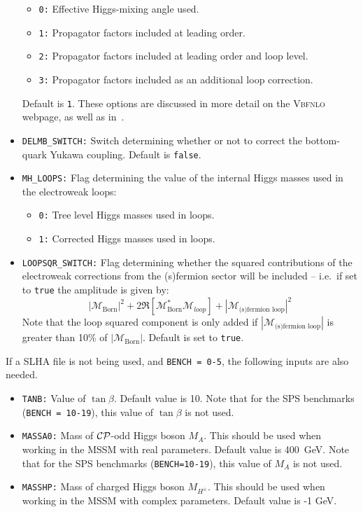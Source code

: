 \documentclass[english,12pt]{article}
\begin{document}
\begin{itemize}
   \begin{itemize}
    \item {\tt 0:} Effective Higgs-mixing angle used.
    \item {\tt 1:} Propagator factors included at leading order.
    \item {\tt 2:} Propagator factors included at leading order and loop level.
    \item {\tt 3:} Propagator factors included as an additional loop correction.
   \end{itemize}
  Default is {\tt 1}.  These options are discussed in more detail on the \textsc{Vbfnlo} webpage, as well as in~\cite{Figy:2010ct}.
  \item {\tt DELMB\_SWITCH:} Switch determining whether or not to correct the bottom-quark
Yukawa coupling.  Default is {\tt false}.
  \item {\tt MH\_LOOPS:} Flag determining the value of the internal Higgs masses used in the electroweak loops:
   \begin{itemize}
    \item {\tt 0:} Tree level Higgs masses used in loops.
    \item {\tt 1:} Corrected Higgs masses used in loops.
   \end{itemize}
  \item {\tt LOOPSQR\_SWITCH:} Flag determining whether the squared contributions of the electroweak corrections from the (s)fermion sector will be included -- i.e.\ if set to {\tt true} the amplitude is given by:
     \begin{equation}
       |\mathcal{M}_{\text{Born}}|^{2} + 2 \Re\left[\mathcal{M}^{*}_{\text{Born}} \mathcal{M}_{loop} \right] + |\mathcal{M}_{\text{(s)fermion loop}}|^{2}
     \end{equation}
    Note that the loop squared component is only added if $|\mathcal{M}_{\text{(s)fermion loop}}|$ is greater than 10\% of $|\mathcal{M}_{\text{Born}}|$.  Default is set to {\tt true}.
\end{itemize}
If a SLHA file is not being used, and {\tt BENCH = 0-5}, the following inputs are also needed.
\begin{itemize}
  \item {\tt TANB:} Value of $\tan \beta$.  Default value is 10.  Note that for
the SPS benchmarks ({\tt BENCH = 10-19}), this value of $\tan \beta$ is not
used.
  \item {\tt MASSA0:} Mass of $\cal{CP}$-odd Higgs boson $M_{A}$.  This should be used
when working in the MSSM with real parameters. Default value is 400~GeV.  Note
that for the SPS benchmarks ({\tt BENCH=10-19}), this value of $M_{A}$ is not
used.
  \item {\tt MASSHP:} Mass of charged Higgs boson $M_{H^{\pm}}$.  This should
be used when working in the MSSM with complex parameters.  Default value is -1
GeV. 
\end{itemize}
\end{document}
